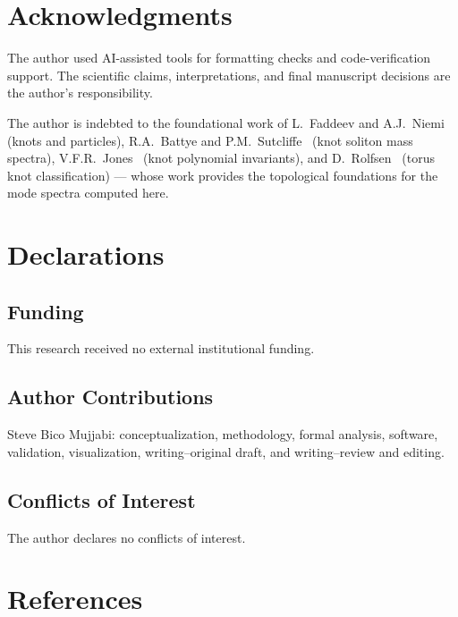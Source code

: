 \documentclass[11pt]{article}
\begin{document}
\section*{Acknowledgments}
The author used AI-assisted tools for formatting checks and code-verification
support. The scientific claims, interpretations, and final manuscript decisions
are the author's responsibility.

The author is indebted to the foundational work of
L.~Faddeev and A.J.~Niemi~\cite{FaddeevNiemi1997} (knots and particles),
R.A.~Battye and P.M.~Sutcliffe~\cite{BattyeSutcliffe1998}
(knot soliton mass spectra),
V.F.R.~Jones~\cite{Jones1985} (knot polynomial invariants),
and D.~Rolfsen~\cite{Rolfsen1976} (torus knot classification)
--- whose work provides the topological foundations for
the mode spectra computed here.

\section*{Declarations}

\subsection*{Funding}
This research received no external institutional funding.

\subsection*{Author Contributions}
Steve Bico Mujjabi: conceptualization, methodology, formal analysis, software,
validation, visualization, writing--original draft, and writing--review and
editing.

\subsection*{Conflicts of Interest}
The author declares no conflicts of interest.

\section*{References}


\end{document}
